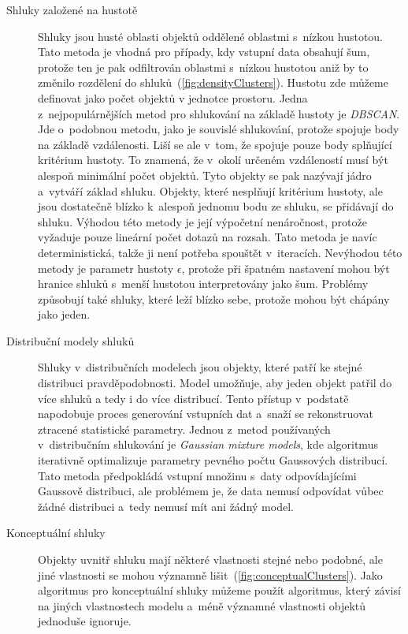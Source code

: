 \begin{description}
\item[Shluky založené na hustotě] Shluky jsou husté oblasti objektů oddělené oblastmi s~nízkou hustotou. Tato metoda je vhodná pro případy, kdy vstupní data obsahují šum, protože ten je pak odfiltrován oblastmi s~nízkou hustotou aniž by to změnilo rozdělení do shluků~(\autoref{fig:densityClusters}). Hustotu zde můžeme definovat jako počet objektů v jednotce prostoru.
Jedna z~nejpopulárnějších metod pro shlukování na základě hustoty je \textit{DBSCAN}. Jde o~podobnou metodu, jako je souvislé shlukování, protože spojuje body na základě vzdálenosti. Liší se ale v~tom, že spojuje pouze body splňující kritérium hustoty. To znamená, že v~okolí určeném vzdáleností musí být alespoň minimální počet objektů. Tyto objekty se pak nazývají jádro a~vytváří základ shluku. Objekty, které nesplňují kritérium hustoty, ale jsou dostatečně blízko k~alespoň jednomu bodu ze shluku, se přidávají do shluku.
Výhodou této metody je její výpočetní nenáročnost, protože vyžaduje pouze lineární počet dotazů na rozsah. Tato metoda je navíc deterministická, takže ji není potřeba spouštět v~iteracích.
Nevýhodou této metody je parametr hustoty $\epsilon$, protože při špatném nastavení mohou být hranice shluků s~menší hustotou interpretovány jako šum. Problémy způsobují také shluky, které leží blízko sebe, protože mohou být chápány jako jeden.

\item[Distribuční modely shluků] Shluky v~distribučních modelech jsou objekty, kte\-ré patří ke stejné distribuci pravděpodobnosti. Model umožňuje, aby jeden objekt patřil do více shluků a tedy i do více distribucí.
Tento přístup v~podstatě napodobuje proces generování vstupních dat a~sna\-ží se rekonstruovat ztracené statistické parametry. %
Jednou z~metod používaných v~distribučním shlukování je \textit {Gaussian mixture models}, kde algoritmus iterativně optimalizuje parametry pevného počtu Gaussových distribucí.
Tato metoda předpokládá vstupní množinu s~daty odpovídajícími Gaussově distribuci, ale problémem je, že data nemusí od\-po\-ví\-dat vůbec žádné distribuci a~tedy nemusí mít ani žádný model.

\item[Konceptuální shluky] Objekty uvnitř shluku mají některé vlastnosti stejné nebo podobné, ale jiné vlastnosti se mohou významně lišit~(\autoref{fig:conceptualClusters}).
Jako algoritmus pro konceptuální shluky můžeme použít algoritmus, který závisí na jiných vlastnostech modelu a~méně významné vlastnosti objektů jednoduše ignoruje.


\end{description}
